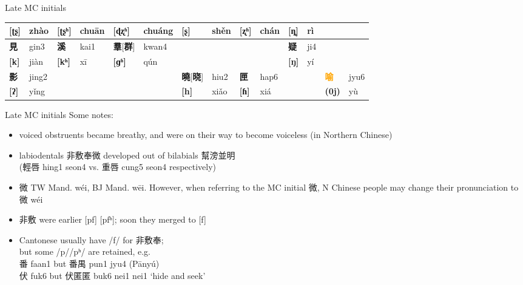 \documentclass{beamer}
\begin{document}
\begin{frame}[fragile]{Late MC initials}
\begin{adjustwidth}{-1.5em}{-1.5em}
\begin{table}
{\begin{tabular}{l l | l l | l l | l l | l l | l l | l l}
            \textbf{[ʈʂ]} & zhào & \textbf{[ʈʂʰ]} & chuān & \textbf{[ɖʐʱ]} & chuáng & \textbf{[ʂ]} & shěn & \textbf{[ʐʱ]} & chán & \textbf{[ȵ]} & rì & & \\ \hline
            \textbf{見} & gin3 & \textbf{溪} & kai1 & \textbf{羣}[\textbf{群}] & kwan4 & & & & & \textbf{疑} & ji4 & & \\
            \textbf{[k]}& jiàn & \textbf{[kʰ]} & xī & \textbf{[ɡʱ]}& qún & & & & & \textbf{[ŋ]}& yí & & \\ \hline
            \textbf{影} & jing2 & & & & & \textbf{曉}[\textbf{晓}] & hiu2 & \textbf{匣} & hap6 & & & \textcolor{orange}{\textbf{喻}} & jyu6 \\
            \textbf{[ʔ]}& yǐng & & & & & \textbf{[h]} & xiǎo & \textbf{[ɦ]} & xiá & & & \textbf{(0j)} & yù \\ \hline
        \end{tabular}}
    \end{table}
\end{adjustwidth}
\end{frame}

\begin{frame}[fragile]{Late MC initials}
Some notes:
\begin{itemize}
    \item voiced obstruents became breathy, and were on their way to become voiceless (in Northern Chinese)
    \item labiodentals 非敷奉微 developed out of bilabials 幫滂並明\\ (輕唇 hing1 seon4 vs. 重唇 cung5 seon4 respectively)
    \item 微 TW Mand. wéi, BJ Mand. wēi. However, when referring to the MC initial 微, N Chinese people may change their pronunciation to 微 wéi 
    \item 非敷 were earlier [pf] [pfʰ]; soon they merged to [f]
    \item Cantonese usually have /f/ for 非敷奉;\\ but some /p//pʰ/ are retained, e.g.\\ 番 faan1 but 番禺 pun1 jyu4 (Pānyú)\\ 伏 fuk6 but 伏匿匿 buk6 nei1 nei1 \enquote*{hide and seek}
    
\end{itemize}

\end{frame}
\end{document}
